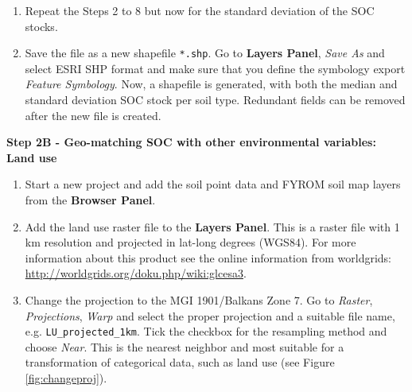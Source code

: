 \documentclass[10pt,b5paper,]{book}
\providecommand{\tightlist}{%
  \setlength{\itemsep}{0pt}\setlength{\parskip}{0pt}}
\theoremstyle{definition}
\theoremstyle{definition}
\theoremstyle{definition}
\theoremstyle{remark}
\begin{document}
\begin{enumerate}
\def\labelenumi{\arabic{enumi}.}
\setcounter{enumi}{9}
\tightlist
\item
  Repeat the Steps 2 to 8 but now for the standard deviation of the SOC
  stocks.
\item
  Save the file as a new shapefile \texttt{*.shp}. Go to \textbf{Layers
  Panel}, \emph{Save As} and select ESRI SHP format and make sure that
  you define the symbology export \emph{Feature Symbology}. Now, a
  shapefile is generated, with both the median and standard deviation
  SOC stock per soil type. Redundant fields can be removed after the new
  file is created.
\end{enumerate}

\textbf{Step 2B - Geo-matching SOC with other environmental variables:
Land use}

\begin{enumerate}
\def\labelenumi{\arabic{enumi}.}
\tightlist
\item
  Start a new project and add the soil point data and FYROM soil map
  layers from the \textbf{Browser Panel}.
\item
  Add the land use raster file to the \textbf{Layers Panel}. This is a
  raster file with 1 km resolution and projected in lat-long degrees
  (WGS84). For more information about this product see the online
  information from worldgrids:
  \url{http://worldgrids.org/doku.php/wiki:glcesa3}.
\item
  Change the projection to the MGI 1901/Balkans Zone 7. Go to
  \emph{Raster}, \emph{Projections}, \emph{Warp} and select the proper
  projection and a suitable file name, e.g. \texttt{LU\_projected\_1km}.
  Tick the checkbox for the resampling method and choose \emph{Near}.
  This is the nearest neighbor and most suitable for a transformation of
  categorical data, such as land use (see Figure \ref{fig:changeproj}).
\end{enumerate}
\end{document}

